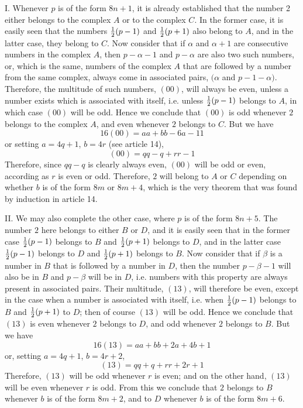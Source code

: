 \documentclass[twoside,12pt]{memoir}
\let\oldfrac\frac
\def\frac#1#2{\mathchoice{\tfrac{#1}{#2}}{\oldfrac{#1}{#2}}{\genfrac{}{}{}{2}{#1}{#2\mathstrut}}{\genfrac{}{}{}{3}{#1}{#2\mathstrut}}}
\begin{document}
I. Whenever \(p\) is of the form \(8n+1\), it is already established that the number 2 either belongs to the complex \(A\) or to the complex \(C\). In the former case, it is easily seen that the numbers \(\frac{1}{2}(p-1)\) and \(\frac{1}{2}(p+1)\) also belong to \(A\), and in the latter case, they belong to \(C\). Now consider that if \(\alpha\) and \(\alpha+1\) are consecutive numbers in the complex \(A\), then \(p-\alpha-1\) and \(p-\alpha\) are also two such numbers, or, which is the same, numbers of the complex \(A\) that are followed by a number from the same complex, always come in associated pairs, \((\alpha\) and \(p-1-\alpha)\). Therefore, the multitude of such numbers, \((00)\), will always be even, unless a number exists which is associated with itself, i{.}e{.} unless \(\frac{1}{2}(p-1)\) belongs to \(A\), in which case \((00)\) will be odd. Hence we conclude that \((00)\) is odd whenever \(2\) belongs to the complex \(A\), and even whenever \(2\) belongs to \(C\). But we have
\[16(00)=a a+b b-6 a-11\]
or setting \(a=4q+1\), \(b=4r\) (see article 14),
\[(00)=q q-q+r r-1\]
Therefore, since \(q q-q\) is clearly always even, \((00)\) will be odd or even, according as \(r\) is even or odd.  Therefore, \(2\) will belong to \(A\) or \(C\) depending on whether \(b\) is of the form \(8m\) or \(8m+4\), which is the very theorem that was found by induction in article 14.

II. We may also complete the other case, where \(p\) is of the form \(8n+5\). The number \(2\) here belongs to either \(B\) or \(D\), and it is easily seen that in the former case \(\frac{1}{2}(p-1)\) belongs to \(B\) and \(\frac{1}{2}(p+1)\) belongs to \(D\), and in the latter case \(\frac{1}{2}(p-1)\) belongs to \(D\) and \(\frac{1}{2}(p+1)\) belongs to \(B\). Now consider that if \(\beta\) is a number in \(B\) that is followed by a number in \(D\), then the number \(p-\beta-1\) will also be in \(B\) and \(p-\beta\) will be in \(D\), i{.}e{.} numbers with this property are always present in associated pairs. Their multitude, \((13)\), will therefore be even, except in the case when a number is associated with itself, i{.}e{.} when \(\frac{1}{2}(p-1)\) belongs to \(B\) and \(\frac{1}{2}(p+1)\) to \(D\); then of course \((13)\) will be odd. Hence we conclude that \((13)\) is even whenever \(2\) belongs to \(D\), and odd whenever \(2\) belongs to \(B\). But we have
\[16(13)=a a+b b+2 a+4 b+1\]\pagebreak%
or, setting \(a=4q+1\), \(b=4r+2\),
\[(13)=q q+q+r r+2 r+1\]
Therefore, \((13)\) will be odd whenever \(r\) is even; and on the other hand, \((13)\) will be even whenever \(r\) is odd. From this we conclude that \(2\) belongs to \(B\) whenever \(b\) is of the form \(8m+2\), and to \(D\) whenever \(b\) is of the form \(8m+6\).\\
\end{document}
